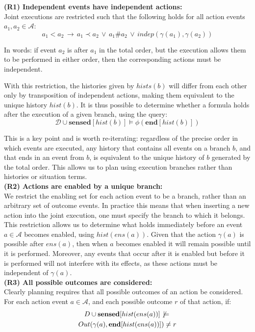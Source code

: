 \textbf{(R1) Independent events have independent actions:}\\
 Joint executions are restricted such that the following holds for
all action events $a_{1},a_{2}\in\mathcal{A}$:\[
a_{1}<a_{2}\,\rightarrow\, a_{1}\prec a_{2}\,\vee\, a_{1}\#a_{2}\,\vee\, indep(\gamma(a_{1}),\gamma(a_{2}))\]


In words: if event $a_{2}$ is after $a_{1}$ in the total order,
but the execution allows them to be performed in either order, then
the corresponding actions must be independent.

With this restriction, the histories given by $hists(b)$ will differ
from each other only by transposition of independent actions, making
them equivalent to the unique history $hist(b)$. It is thus possible
to determine whether a formula holds after the execution of a given
branch, using the query:\[
\mathcal{D}\cup\mathbf{sensed}[hist(b)]\models\phi(\mathbf{end}[hist(b)])\]


This is a key point and is worth re-iterating: regardless of the precise
order in which events are executed, any history that contains all
events on a branch $b$, and that ends in an event from $b$, is equivalent
to the unique history of $b$ generated by the total order. This allows
us to plan using execution branches rather than histories or situation
terms.\\


\textbf{(R2) Actions are enabled by a unique branch:}\\
 We restrict the enabling set for each action event to be a branch,
rather than an arbitrary set of outcome events. In practice this means
that when inserting a new action into the joint execution, one must
specify the branch to which it belongs. This restriction allows us
to determine what holds immediately before an event $a\in\mathcal{A}$
becomes enabled, using $hist(ens(a))$. Given that the action $\gamma(a)$
is possible after $ens(a)$, then when $a$ becomes enabled it will
remain possible until it is performed. Moreover, any events that occur
after it is enabled but before it is performed will not interfere
with its effects, as these actions must be independent of $\gamma(a)$.
\\


\textbf{(R3) All possible outcomes are considered:}\\
 Clearly planning requires that all possible outcomes of an action
be considered. For each action event $a\in\mathcal{A}$, and each
possible outcome $r$ of that action, if:\begin{multline*}
D\cup\mathbf{sensed}[hist(ens(a))]\not\,\models\,\\
Out(\gamma(a),\mathbf{end}[hist(ens(a))])\neq r\end{multline*}


